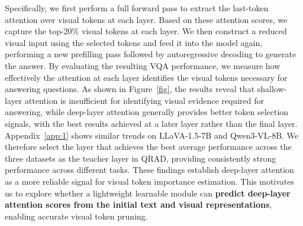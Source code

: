 Specifically, we first perform a full forward pass to extract the last-token attention over visual tokens at each layer. Based on these attention scores, we capture the top-20\% visual tokens at each layer. We then construct a reduced visual input using the selected tokens and feed it into the model again, performing a new prefilling pass followed by autoregressive decoding to generate the answer. By evaluating the resulting VQA performance, we measure how effectively the attention at each layer identifies the visual tokens necessary for answering questions. As shown in Figure~\ref{fig}, the results reveal that shallow-layer attention is insufficient for identifying visual evidence required for answering, while deep-layer attention generally provides better token selection signals, with the best results achieved at a later layer rather than the final layer. Appendix~\ref{app:1} shows similar trends on LLaVA-1.5-7B and Qwen3-VL-8B. We therefore select the layer that achieves the best average performance across the three datasets as the teacher layer in QRAD, providing consistently strong performance across different tasks.
These findings establish deep-layer attention as a more reliable signal for visual token importance estimation. This motivates us to explore whether a lightweight learnable module can \textbf{predict deep-layer attention scores from the initial text and visual representations}, enabling accurate visual token pruning.

